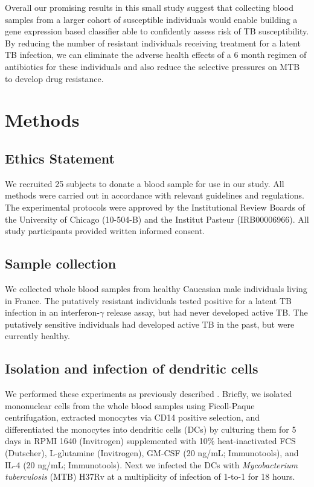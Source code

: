 \documentclass[fleqn,10pt]{wlscirep}
\begin{document}
Overall our promising results in this small study suggest that
collecting blood samples from a larger cohort of susceptible
individuals would enable building a gene expression based classifier
able to confidently assess risk of TB susceptibility. By reducing the
number of resistant individuals receiving treatment for a latent TB
infection, we can eliminate the adverse health effects of a 6 month
regimen of antibiotics for these individuals and also reduce the
selective pressures on MTB to develop drug resistance.
\section*{Methods}

\subsection*{Ethics Statement}

We recruited 25 subjects to donate a blood sample for use in our
study. All methods were carried out in accordance with relevant
guidelines and regulations. The experimental protocols were approved
by the Institutional Review Boards of the University of Chicago
(10-504-B) and the Institut Pasteur (IRB00006966). All study
participants provided written informed consent.
\subsection*{Sample collection}

We collected whole blood samples from healthy Caucasian male
individuals living in France. The putatively resistant individuals
tested positive for a latent TB infection in an interferon-$\gamma$
release assay, but had never developed active TB. The putatively
sensitive individuals had developed active TB in the past, but were
currently healthy.
\subsection*{Isolation and infection of dendritic cells}

We performed these experiments as previously described
\cite{Barreiro2012}. Briefly, we isolated mononuclear cells from the
whole blood samples using Ficoll-Paque centrifugation, extracted
monocytes via CD14 positive selection, and differentiated the
monocytes into dendritic cells (DCs) by culturing them for 5 days in
RPMI 1640 (Invitrogen) supplemented with 10\% heat-inactivated FCS
(Dutscher), L-glutamine (Invitrogen), GM-CSF (20 ng/mL; Immunotools),
and IL-4 (20 ng/mL; Immunotools). Next we infected the DCs with
\emph{Mycobacterium tuberculosis} (MTB) H37Rv at a multiplicity of
infection of 1-to-1 for 18 hours.
\end{document}
